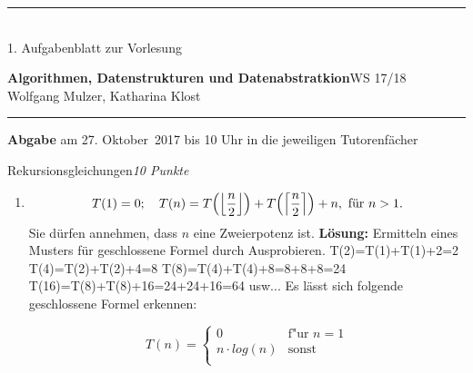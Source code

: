 \documentclass[a4paper,twoside,12pt]{article}
\newcommand{\ZETTELNUMMER}{1}
\newcommand{\ABGABEDATUM}{am 27. Oktober~2017 bis 10 Uhr in die 
  jeweiligen Tutorenf\"acher}
\newcounter{AUFGNR}
\newcommand{\AUFGABE}[2]{\vspace{0.3cm}\item[Aufgabe \arabic{AUFGNR}]\stepcounter{AUFGNR} #1\hfill\emph{#2}}
\begin{document}
\pagestyle{empty}
\hrule\medskip
\rule{0ex}{0ex}\\[-1ex]
\ZETTELNUMMER. Aufgabenblatt zur Vorlesung

\smallskip
\noindent
\large
\textbf{Algorithmen, Datenstrukturen und Datenabstratkion}\hfill WS 17/18 \\[0.5ex]
\normalsize
Wolfgang Mulzer, Katharina Klost

\medskip\hrule

\smallskip
\noindent
\textbf{Abgabe} \ABGABEDATUM

\vskip 0.5cm

\begin{description}

\AUFGABE{Rekursionsgleichungen}{10 Punkte}

\begin{enumerate}
  \item
    \[
       T(1) = 0; \quad T(n) = 
       T\Bigl(\left\lfloor \frac{n}{2}\right\rfloor\Bigr) +
                 T\Bigl(\left\lceil \frac{n}{2} \right\rceil\Bigr) + n, 
		 \text{ f\"ur } n > 1.
    \]
    Sie d\"urfen annehmen, dass $n$ eine Zweierpotenz ist.
\newline    
\newline  
\textbf{L\"osung:}
\newline  Ermitteln eines Musters f\"ur geschlossene Formel durch Ausprobieren.
\newline T(2)=T(1)+T(1)+2=2
\newline T(4)=T(2)+T(2)+4=8
\newline T(8)=T(4)+T(4)+8=8+8+8=24
\newline T(16)=T(8)+T(8)+16=24+24+16=64
\newline usw...
\newline
\newline Es lässt sich folgende geschlossene Formel erkennen: 

\begin{equation*}
   T(n) =
   \begin{cases}
     0 & \text{f"ur } n=1 \\
     n \cdot log(n) & \text{sonst} \\
   \end{cases}
\end{equation*}


\end{enumerate}
\end{description}
\end{document}
